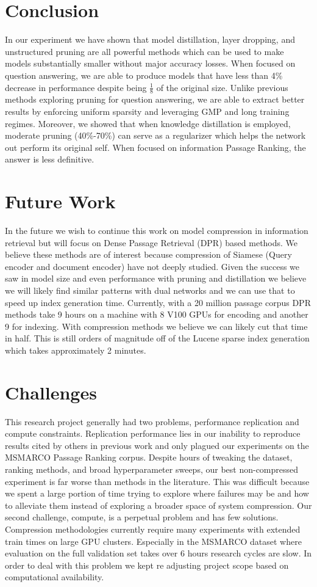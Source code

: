 \section{Conclusion}
In our experiment we have shown that model distillation, layer dropping, and unstructured pruning are all powerful methods which can be used to make models substantially smaller without major accuracy losses. When focused on question answering, we are able to produce models that have less than 4\% decrease in performance despite being $\frac{1}{8}$ of the original size. Unlike previous methods exploring pruning for question answering, we are able to extract better results by enforcing uniform sparsity and leveraging GMP and long training regimes. Moreover, we showed that when knowledge distillation is employed, moderate pruning (40\%-70\%) can serve as a regularizer which helps the network out perform its original self. When focused on information Passage Ranking, the answer is less definitive. 
\section{Future Work}
In the future we wish to continue this work on model compression in information retrieval but will focus on Dense Passage Retrieval (DPR) \cite{Karpukhin2020DensePR} based methods. We believe these methods are of interest because compression of Siamese (Query encoder and document encoder) have not deeply studied. Given the success we saw in model size and even performance with pruning and distillation we believe we will likely find similar patterns with dual networks and we can use that to speed up index generation time. Currently, with a 20 million passage corpus DPR methods take 9 hours on a machine with 8 V100 GPUs for encoding and another 9 for indexing. With compression methods we believe we can likely cut that time in half. This is still orders of magnitude off of the Lucene sparse index generation which takes approximately 2 minutes. 
\section{Challenges}
This research project generally had two problems, performance replication and compute constraints. Replication performance lies in our inability to reproduce results cited by others in previous work and only plagued our experiments on the MSMARCO Passage Ranking corpus. Despite hours of tweaking the dataset, ranking methods, and broad hyperparameter sweeps, our best non-compressed experiment is far worse than methods in the literature. This was difficult because we spent a large portion of time trying to explore where failures may be and how to alleviate them instead of exploring a broader space of system compression. Our second challenge, compute, is a perpetual problem and has few solutions. Compression methodologies currently require many experiments with extended train times on large GPU clusters. Especially in the MSMARCO dataset where evaluation on the full validation set takes over 6 hours research cycles are slow. In order to deal with this problem we kept re adjusting project scope based on computational availability.  